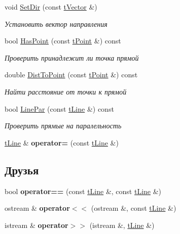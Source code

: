 \begin{DoxyCompactItemize}
void \hyperlink{classtLine_acff75aa6563c398c06c2ed5e4d118bb4}{Set\+Dir} (const \hyperlink{classtVector}{t\+Vector} \&)
\begin{DoxyCompactList}\small\item\em Установить вектор направления \end{DoxyCompactList}\item 
\mbox{\label{classtLine_aeab725824ab76aa77c24c909086647f7}} 
bool \hyperlink{classtLine_aeab725824ab76aa77c24c909086647f7}{Has\+Point} (const \hyperlink{classtPoint}{t\+Point} \&) const
\begin{DoxyCompactList}\small\item\em Проверить принадлежит ли точка прямой \end{DoxyCompactList}\item 
\mbox{\label{classtLine_a5b0fe2c1ec1e51fdd35021ab37532ea8}} 
double \hyperlink{classtLine_a5b0fe2c1ec1e51fdd35021ab37532ea8}{Dist\+To\+Point} (const \hyperlink{classtPoint}{t\+Point} \&) const
\begin{DoxyCompactList}\small\item\em Найти расстояние от точки к прямой \end{DoxyCompactList}\item 
\mbox{\label{classtLine_a1c3671f6868050035c0b2e5c90eaa143}} 
bool \hyperlink{classtLine_a1c3671f6868050035c0b2e5c90eaa143}{Line\+Par} (const \hyperlink{classtLine}{t\+Line} \&) const
\begin{DoxyCompactList}\small\item\em Проверить прямые на паралельность \end{DoxyCompactList}\item 
\mbox{\label{classtLine_aca3e282559b32039c0aae22eaff100f6}} 
\hyperlink{classtLine}{t\+Line} \& {\bfseries operator=} (const \hyperlink{classtLine}{t\+Line} \&)
\end{DoxyCompactItemize}
\subsection*{Друзья}
\begin{DoxyCompactItemize}
\item 
\mbox{\label{classtLine_a39d9dbc55c19c2857c4d8fee4d25c667}} 
bool {\bfseries operator==} (const \hyperlink{classtLine}{t\+Line} \&, const \hyperlink{classtLine}{t\+Line} \&)
\item 
\mbox{\label{classtLine_a74399479e67eadce300f996b6ddf21c3}} 
ostream \& {\bfseries operator$<$$<$} (ostream \&, const \hyperlink{classtLine}{t\+Line} \&)
\item 
\mbox{\label{classtLine_a0f6f0d2af6275b58e63e6f5667bf587f}} 
istream \& {\bfseries operator$>$$>$} (istream \&, \hyperlink{classtLine}{t\+Line} \&)
\end{DoxyCompactItemize}


